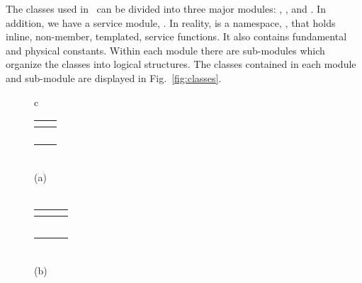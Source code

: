 The classes used in \imctest\ can be divided into three major modules:
, , and .  In addition,
we have a service module, .  In reality,  is a
namespace, , that holds inline, non-member,
templated, service functions.  It also contains fundamental and
physical constants.  Within each module there are sub-modules which
organize the classes into logical structures. The classes contained in
each module and sub-module are displayed in Fig.~\ref{fig:classes}.
\begin{figure}
  \begin{center}
    \begin{tabular}{c}
      \vspace{1\baselineskip} \\
      \begin{tabular}{|l|l|} \hline
        \multicolumn{1}{|c|}{\mle{Interface}} & 
        \multicolumn{1}{c|}{\mle{Builder}} \\\hline
        \comp{OS\_Interface} & \comp{OS\_Builder} \\
        & \comp{Opacity\_Builder\tlate{MT}} \\
        & \comp{Source\_Builder\tlate{MT}} \\
        & \comp{Parallel\_Builder\tlate{MT}} \\\hline
      \end{tabular} \\
      (a) \\
      \vspace{1\baselineskip} \\
      \begin{tabular}{|l|l|l|}\hline
        \multicolumn{1}{|c|}{\mle{Mesh}} &
        \multicolumn{1}{c}{\mle{Material}} &
        \multicolumn{1}{|c|}{\mle{Transport}} \\\hline
        \comp{OS\_Mesh} &  \comp{Mat\_State\tlate{MT}} &
        \comp{Source\tlate{MT, RN}} \\
        \comp{Coord\_sys} & \comp{Opacity\tlate{MT}} &
        \comp{Particle\tlate{MT, RN}} \\
        \comp{Layout} & & \comp{Random} \\
        & & \comp{Particle\_Stack\tlate{PT}} \\
        & & \comp{Tally\tlate{MT}} \\\hline
      \end{tabular} \\
      (b) \\

\end{tabular}
\end{center}
\end{figure}
